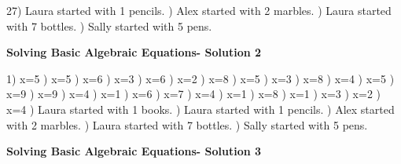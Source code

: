 \documentclass{article}%
\begin{document}
27) Laura started with 1 pencils.%
) Alex started with 2 marbles.%
) Laura started with 7 bottles.%
) Sally started with 5 pens.%
\newline%
\newpage%
\large%
\begin{center}%
\textbf{Solving Basic Algebraic Equations- Solution 2}%
\newline%
\end{center} \normalsize%
1) x=5%
) x=5%
) x=6%
) x=3%
) x=6%
) x=2%
) x=8%
) x=5%
) x=3%
) x=8%
) x=4%
) x=5%
) x=9%
) x=9%
) x=4%
) x=1%
) x=6%
) x=7%
) x=4%
) x=1%
) x=8%
) x=1%
) x=3%
) x=2%
) x=4%
) Laura started with 1 books.%
) Laura started with 1 pencils.%
) Alex started with 2 marbles.%
) Laura started with 7 bottles.%
) Sally started with 5 pens.%
\newline%
\newpage%
\large%
\begin{center}%
\textbf{Solving Basic Algebraic Equations- Solution 3}%
\newline%
\end{center} \normalsize%
\end{document}
